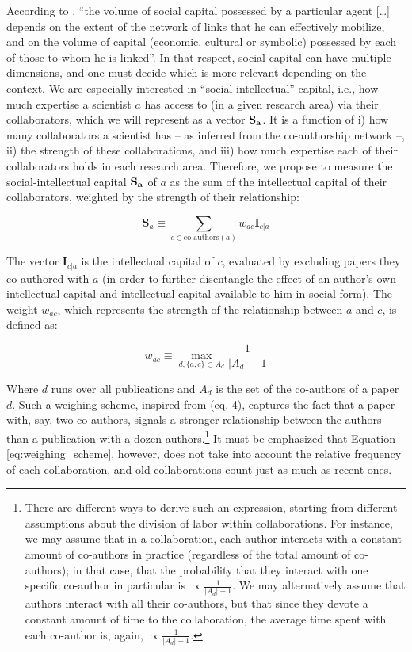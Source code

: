 \documentclass{article}
\begin{document}
According to \citet{Bourdieu1980}, ``the volume of social capital possessed by a particular agent [\dots] depends on the extent of the network of links that he can effectively mobilize, and on the volume of capital (economic, cultural or symbolic) possessed by each of those to whom he is linked''. In that respect, social capital can have multiple dimensions, and one must decide which is more relevant depending on the context. We are especially interested in ``social-intellectual'' capital, i.e., how much expertise a scientist $a$ has access to (in a given research area) via their collaborators, which we will represent as a vector $\bf{S}_{a}$. It is a function of i) how many collaborators a scientist has -- as inferred from the co-authorship network --, ii) the strength of these collaborations, and iii) how much expertise each of their collaborators holds in each research area. Therefore, we propose to measure the social-intellectual capital $\bf{S}_{a}$ of $a$ as the sum of the intellectual capital of their collaborators, weighted by the strength of their relationship:

\begin{equation}
    \bm{S}_{a} \equiv \sum_{c \in \text{co-authors}(a)} w_{ac} \bm{I}_{c|a}
\end{equation}

The vector $\bm{I}_{c|a}$ is the intellectual capital of $c$, evaluated by excluding papers they co-authored with $a$ (in order to further disentangle the effect of an author's own intellectual capital and intellectual capital available to him in social form). The weight $w_{ac}$, which represents the strength of the relationship between $a$ and $c$, is defined as:

\begin{equation}
    w_{ac} \equiv \max_{d, \{a,c\} \subset A_d} \frac{1}{|A_d|-1}
    \label{eq:weighing_scheme}
\end{equation}

Where $d$ runs over all publications and $A_d$ is the set of the co-authors of a paper $d$. Such a weighing scheme, inspired from \citealt{Newman2004} (eq. 4), captures the fact that a paper with, say, two co-authors, signals a stronger relationship between the authors than a publication with a dozen authors.\footnote{There are different ways to derive such an expression, starting from different assumptions about the division of labor within collaborations. For instance, we may assume that in a collaboration, each author interacts with a constant amount of co-authors in practice (regardless of the total amount of co-authors); in that case, that the probability that they interact with one specific co-author in particular is $\propto \frac{1}{|A_d|-1}$. We may alternatively assume that authors interact with all their co-authors, but that since they devote a constant amount of time to the collaboration, the average time spent with each co-author is, again, $\propto \frac{1}{|A_d|-1}$.} It must be emphasized that Equation \eqref{eq:weighing_scheme}, however, does not take into account the relative frequency of each collaboration, and old collaborations count just as much as recent ones.
\end{document}
